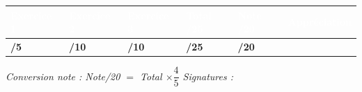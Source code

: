 \documentclass[a4paper,11pt]{article}
\begin{document}
\vspace{0.6cm}

\begin{tcolorbox}[colback=grislight, colframe=entete,
                  sharp corners, boxrule=1.2pt]
\begin{center}
\renewcommand{\arraystretch}{2.2}
\begin{tabular}{|>{\centering\arraybackslash}p{3cm}
                |>{\centering\arraybackslash}p{2cm}
                |>{\centering\arraybackslash}p{2cm}
                |>{\centering\arraybackslash}p{2cm}
                |>{\centering\arraybackslash}p{2cm}
                |>{\centering\arraybackslash}p{2.5cm}|}
\hline
\rowcolor{entete}
\textcolor{white}{\textbf{Exercice 1}} &
\textcolor{white}{\textbf{Exercice 2}} &
\textcolor{white}{\textbf{Exercice 3}} &
\textcolor{white}{\textbf{Total /25}} &
\textcolor{white}{\textbf{Note /20}} &
\textcolor{white}{\textbf{Appréciation}} \\
\hline
\Large\textbf{\hspace{1cm}/5} &
\Large\textbf{\hspace{1cm}/10} &
\Large\textbf{\hspace{1cm}/10} &
\Large\textbf{\hspace{1cm}/25} &
\Large\textbf{\hspace{1cm}/20} &
\\
\hline
\end{tabular}
\end{center}
\end{tcolorbox}

\vspace{0.4cm}

\begin{tcolorbox}[colback=white, colframe=grismid,
                  sharp corners, boxrule=0.5pt,
                  title={\textbf{Observations}}, fonttitle=\bfseries]
\vspace{2.5cm}
\end{tcolorbox}

\vspace{0.3cm}
\noindent\textit{\small Conversion note : Note/20 $=$ Total $\times \dfrac{4}{5}$
\hspace{1cm}
Signatures : \dotfill}
\end{document}
